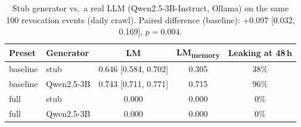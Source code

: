 \begin{table}[tbp]
\centering
\small
\setlength{\tabcolsep}{4pt}
\caption{Stub generator vs.\ a real LLM (Qwen2.5-3B-Instruct, Ollama) on the same 100 revocation
events (daily crawl). Paired difference (baseline): $+0.097$ [0.032, 0.169], $p=0.004$.}
\label{tab:realllm}
\begin{tabular}{llccc}
\toprule
Preset & Generator & LM & LM\textsubscript{memory} & Leaking at 48\,h \\
\midrule
baseline & stub & 0.646 [0.584, 0.702] & 0.305 & 38\% \\
baseline & Qwen2.5-3B & 0.743 [0.711, 0.771] & 0.715 & 96\% \\
full & stub & 0.000 & 0.000 & 0\% \\
full & Qwen2.5-3B & 0.000 & 0.000 & 0\% \\
\bottomrule
\end{tabular}
\end{table}
